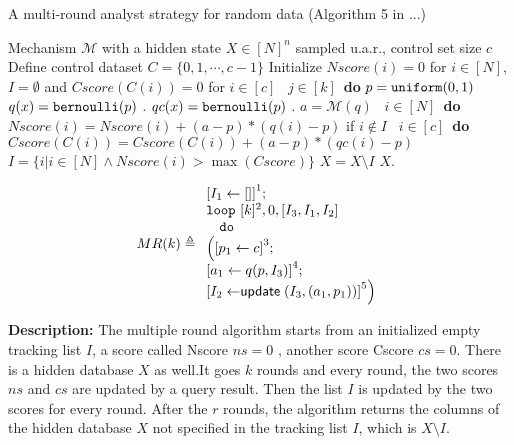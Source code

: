 \begin{example}
%
\begin{algorithm}
\footnotesize
\caption{A multi-round analyst strategy for random data (Algorithm 5 in ...)}
\label{alg:multiRound}
\begin{algorithmic}
\REQUIRE Mechanism $\mathcal{M}$ with a hidden state $X\in [N]^{n}$ sampled u.a.r., control set size $c$
\STATE Define control dataset $C = \{0,1, \cdots, c - 1\}$
\STATE Initialize $Nscore(i) = 0$ for $i \in [N]$, $I = \emptyset$ and $Cscore(C(i)) = 0$ for $i \in [c]$
\ $j\in [k]$\ {\bf do} 
\STATE {} $p=\mathtt{uniform}(0,1)$ 
\STATE {} $q (x) = \mathtt{bernoulli} ( p )$ .
\STATE {} $qc (x) = \mathtt{bernoulli} ( p )$ .
\STATE {} $a = \mathcal{M}(q)$ 
\STATE {}\ $i \in [N]$\ {\bf do}
\STATE \qquad \qquad $Nscore(i) = Nscore(i) + (a - p)*(q (i) - p)$ if $i \notin I$
\STATE {}\ $i \in [c]$\ {\bf do}
\STATE \qquad \qquad $Cscore(C(i)) = Cscore(C(i)) + (a - p)*(qc (i) - p)$
\STATE {} $I = \{i | i\in [N] \land Nscore(i) > \max(Cscore)\}$
\STATE {} $X = X \setminus I$ 
\RETURN $X$.
\end{algorithmic}
\end{algorithm}
%
\[
%
MR(k) \triangleq
\begin{array}{l}
    \left[I_1 \leftarrow [] \right]^1; \\
    \eloop ~ [k]^{2} , 0, [I_3,I_1,I_2] \\ 
    \ ~ \edo ~ \\ \Big(
    \left[p_1 \leftarrow c \right]^3 ; \\
    \left[ a_1 \leftarrow q (p, I_3) \right]^4;\\
    \left[I_2 \leftarrow \mathrel{\mathsf{update}} ( {I_3}, (a_1, p_1))  \right]^5
    \Big) 
\end{array}
\]
\end{example}
\textbf{Description:}
The multiple round algorithm starts from an initialized empty tracking list $I$, a score called Nscore $ns=0$ , another score Cscore $cs=0$. There is a hidden database $X$ as well.It goes $k$ rounds and every round, the two scores $ns$ and $cs$ are updated by a query result. Then the list $I$ is updated by the two scores for every round. After the $r$ rounds, the algorithm returns the columns of the hidden database $X$ not specified in the tracking list $I$, which is $X\setminus I$. 

